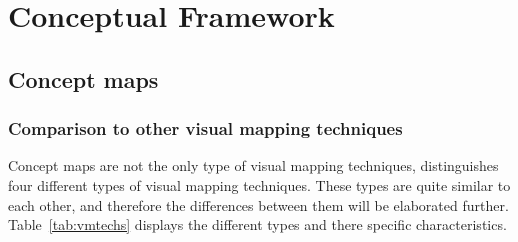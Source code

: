 \chapter{Conceptual Framework}

    \section{Concept maps}

        \subsection{Comparison to other visual mapping techniques}

        Concept maps are not the only type of visual mapping techniques,  distinguishes four different types of visual mapping techniques. These types are quite similar to each other, and therefore the differences between them will be elaborated further. Table~\ref{tab:vmtechs} displays the different types and there specific characteristics.

